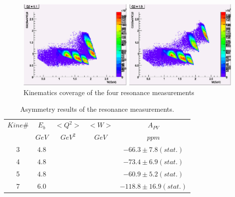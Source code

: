\begin{figure}[ht]
  \centering
  \includegraphics[width=1.0\textwidth]{DW/res_kine.eps}
  \caption{Kinematics coverage of the four resonance measurements}\label{fig:reskine}
\end{figure}

\begin{table}[!htp]
  \begin{center}
    \begin{tabular}{c|c|c|c|c}
      \hline
      $Kine\#$   &   $E_b$    &    $<Q^2>$   &   $<W>$   &   $A_{PV}$ \\
                 &   $GeV$    &    $GeV^2$   &   $GeV$ &   $ppm$   \\
      \hline
      3\*        &    $4.8$   &              &         &
      $-66.3\pm 7.8(stat.)$ \\ 
      4          &    $4.8$   &              &         &   $-73.4\pm 6.9(stat.)$ \\ 
      5          &    $4.8$   &              &         &   $-60.9\pm 5.2(stat.)$ \\ 
      7          &    $6.0$   &              &         &   $-118.8\pm 16.9(stat.)$ \\ \hline
      \end{tabular}
  \end{center}
  \caption{Asymmetry results of the resonance measurements.}\label{tab:resasym}
\end{table}

